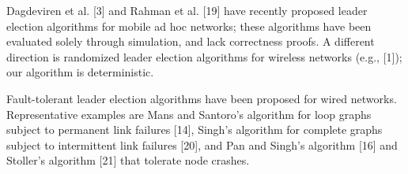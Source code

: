 Dagdeviren et al. [3] and Rahman et al. [19] have recently proposed leader election algorithms for mobile ad hoc networks; these algorithms have been evaluated solely through simulation, and lack correctness proofs. A different direction is randomized leader election algorithms for wireless networks (e.g., [1]); our algorithm is deterministic.

Fault-tolerant leader election algorithms have been proposed for wired networks. Representative examples are Mans and Santoro’s algorithm for loop graphs subject to permanent link failures [14], Singh’s algorithm for complete graphs subject to intermittent link failures [20], and Pan and Singh’s algorithm [16] and Stoller’s algorithm [21] that tolerate node crashes.